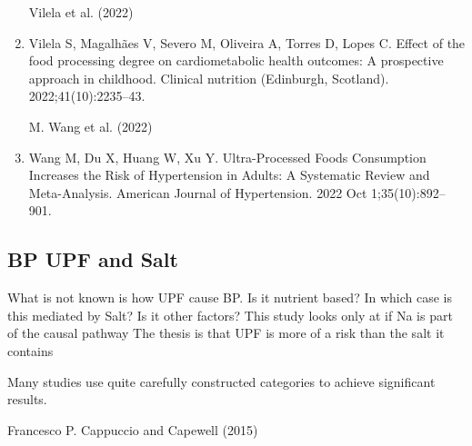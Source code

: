 \documentclass[
]{article}
\begin{document}
\begin{enumerate}
  Vilela et al. (2022)
\item
  Vilela S, Magalhães V, Severo M, Oliveira A, Torres D, Lopes C. Effect
  of the food processing degree on cardiometabolic health outcomes: A
  prospective approach in childhood. Clinical nutrition (Edinburgh,
  Scotland). 2022;41(10):2235--43.

  M. Wang et al. (2022)
\item
  Wang M, Du X, Huang W, Xu Y. Ultra-Processed Foods Consumption
  Increases the Risk of Hypertension in Adults: A Systematic Review and
  Meta-Analysis. American Journal of Hypertension. 2022 Oct
  1;35(10):892--901.
\end{enumerate}

\hypertarget{bp-upf-and-salt}{%
\subsection{BP UPF and Salt}\label{bp-upf-and-salt}}

What is not known is how UPF cause BP. Is it nutrient based? In which
case is this mediated by Salt? Is it other factors? This study looks
only at if Na is part of the causal pathway The thesis is that UPF is
more of a risk than the salt it contains

Many studies use quite carefully constructed categories to achieve
significant results.

Francesco P. Cappuccio and Capewell (2015)
\end{document}
